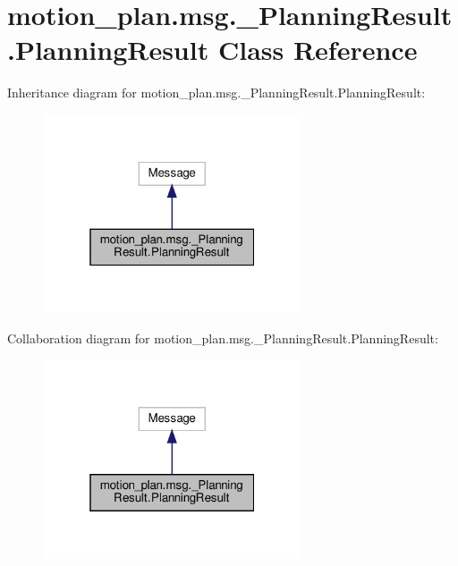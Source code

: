 \hypertarget{classmotion__plan_1_1msg_1_1__PlanningResult_1_1PlanningResult}{}\section{motion\+\_\+plan.\+msg.\+\_\+\+Planning\+Result.\+Planning\+Result Class Reference}
\label{classmotion__plan_1_1msg_1_1__PlanningResult_1_1PlanningResult}


Inheritance diagram for motion\+\_\+plan.\+msg.\+\_\+\+Planning\+Result.\+Planning\+Result\+:
\nopagebreak
\begin{figure}[H]
\begin{center}
\leavevmode
\includegraphics[width=217pt]{classmotion__plan_1_1msg_1_1__PlanningResult_1_1PlanningResult__inherit__graph}
\end{center}
\end{figure}


Collaboration diagram for motion\+\_\+plan.\+msg.\+\_\+\+Planning\+Result.\+Planning\+Result\+:
\nopagebreak
\begin{figure}[H]
\begin{center}
\leavevmode
\includegraphics[width=217pt]{classmotion__plan_1_1msg_1_1__PlanningResult_1_1PlanningResult__coll__graph}
\end{center}
\end{figure}
